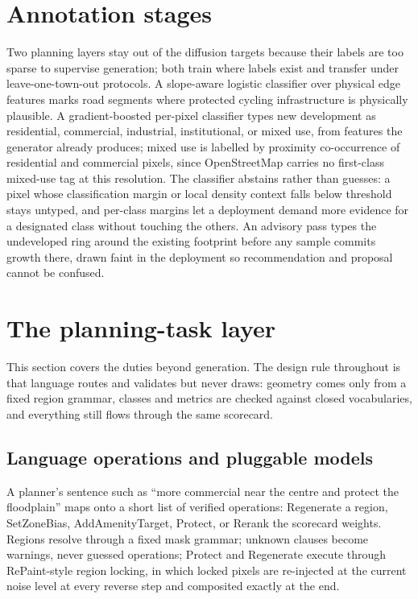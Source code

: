 \documentclass[11pt]{article}
\begin{document}
\section{Annotation stages}
\label{sec:posthoc}
Two planning layers stay out of the diffusion targets because their
labels are too sparse to supervise generation; both train where labels
exist and transfer under leave-one-town-out protocols. A
slope-aware logistic classifier over physical edge features marks road
segments where protected cycling infrastructure is physically
plausible. A gradient-boosted per-pixel classifier types new
development as residential, commercial, industrial, institutional, or
mixed use, from features the generator already produces; mixed use is
labelled by proximity co-occurrence of residential and
commercial pixels, since OpenStreetMap carries no first-class mixed-use
tag at this resolution. The classifier abstains rather than guesses: a
pixel whose classification margin or local density context falls below
threshold stays untyped, and per-class margins let a deployment demand
more evidence for a designated class without touching the others. An
advisory pass types the undeveloped ring around the existing footprint
before any sample commits growth there, drawn faint in the deployment
so recommendation and proposal cannot be confused.

\section{The planning-task layer}
\label{sec:tasks}

This section covers the duties beyond generation. The design rule
throughout is that language routes and validates but never draws:
geometry comes only from a fixed region grammar, classes and metrics
are checked against closed vocabularies, and everything still flows
through the same scorecard.

\subsection{Language operations and pluggable models}
\label{sec:llm}
A planner's sentence such as ``more commercial near the centre and
protect the floodplain'' maps onto a short list of verified
operations: Regenerate a region, SetZoneBias, AddAmenityTarget,
Protect, or Rerank the scorecard weights. Regions resolve through a
fixed mask grammar; unknown clauses become warnings, never guessed
operations; Protect and Regenerate execute through RePaint-style
region locking, in which locked pixels are re-injected at the current
noise level at every reverse step and composited exactly at the end.
\end{document}
